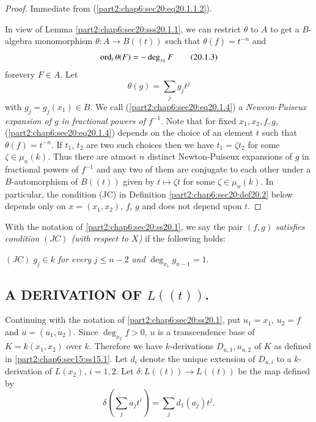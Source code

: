 \begin{proof}
  Immediate from (\ref{part2:chap6:sec20:eq20.1.1.2}).

In view of Lemma \ref{part2:chap6:sec20:sss20.1.1}, we can restrict
$\theta$ to $A$ to get a $B$-algebra monomorphism $\theta: A \to
B((t))$ such that $\theta (f) = t^{-n}$ and 
\begin{equation*}
  \operatorname{ord}_t \theta (F) =- \deg_{x_2} F
  \tag{20.1.3}\label{part2:chap6:sec20:eq20.1.3} 
\end{equation*}
for\pageoriginale every $F \in A$. Let
\begin{equation*}
  \theta (g) = \sum_j g_j t^j \tag{20.1.4}\label{part2:chap6:sec20:eq20.1.4} 
\end{equation*}
with $g_j = g_j (x_1) \in B$. We call
(\ref{part2:chap6:sec20:eq20.1.4}) a {\em Newcon-Puiseux expansion of
  $g$ in fractional powers of $f^{-1}$}. Note that for fixed $x_1,
x_2, f, g$, (\ref{part2:chap6:sec20:eq20.1.4}) depends on the choice
of an element $t$ such that $\theta (f)= t^{-n}$. If $t_1$, $t_2$ are
two such choices then we have $t_1 = \zeta t_2$ for some $\zeta \in
\mu_n (k)$. Thus there are atmost $n$ distinct Newton-Puiseux
expansions of $g$ in fractional powers of $f^{-1}$ and any two of
them are conjugate to each other under a $B$-automorphism of $B((t))$
given by $t \mapsto \zeta t$ for some $\zeta \in \mu_n (k)$. In
particular, the condition (JC) in
Definition \ref{part2:chap6:sec20:def20.2} below depends only on $x=
(x_1, x_2)$, $f$, $g$ and does not depend upon $t$.
\end{proof}

\setcounter{thm}{1}
\begin{defi}\label{part2:chap6:sec20:def20.2} 
  With the notation of \ref{part2:chap6:sec20:ss20.1}, we say the pair
  $(f, g)$ {\em satisfies condition $(JC)$ (with respect to $X$)} if the
  following holds:

  $(JC) \; g_j \in k$ {\em for every} $j \leq n-2$ {\em and} $\deg_{x_1}
  g_{n-1}=1$. 
\end{defi}

\setcounter{subsection}{2}
\subsection{A DERIVATION OF $L((t))$.}\label{part2:chap6:sec20:ss20.3}

Continuing with the notation of \ref{part2:chap6:sec20:ss20.1}, put
$u_1 = x_1$, $u_2 = f$ and $u= (u_1, u_2)$. Since $\deg_{x_2} f> 0$,
$u$ is a transcendence base of $K=k(x_1, x_2)$ over $k$. Therefore we
have $k$-derivations $D_{u, 1}, u_{u, 2}$ of $K$ as defined
in \ref{part2:chap6:sec15:ss15.1}. Let $d_i$ denote the unique
extension of $D_{u, i}$ to a $k$-derivation of $L(x_2)$, $i = 1,
2$. Let $\delta : L((t)) \to L ((t))$ be the map defined by 
$$
\delta \left( \sum_j a_j t^i \right) = \sum_j d_1 (a_j) t^j.
$$
 
